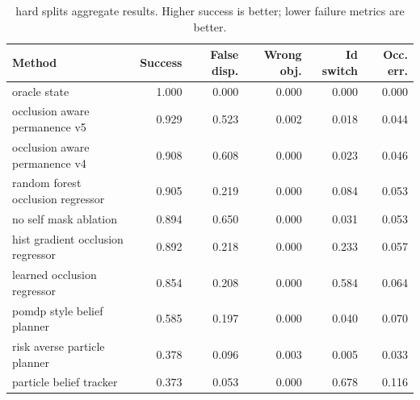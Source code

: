 \begin{table}[t]
\centering
\caption{hard splits aggregate results. Higher success is better; lower failure metrics are better.}
\label{tab:hard_splits}
\small
\begin{tabular}{lrrrrr}
\toprule
Method & Success & False disp. & Wrong obj. & Id switch & Occ. err. \\
\midrule
oracle state & 1.000 & 0.000 & 0.000 & 0.000 & 0.000 \\
occlusion aware permanence v5 & 0.929 & 0.523 & 0.002 & 0.018 & 0.044 \\
occlusion aware permanence v4 & 0.908 & 0.608 & 0.000 & 0.023 & 0.046 \\
random forest occlusion regressor & 0.905 & 0.219 & 0.000 & 0.084 & 0.053 \\
no self mask ablation & 0.894 & 0.650 & 0.000 & 0.031 & 0.053 \\
hist gradient occlusion regressor & 0.892 & 0.218 & 0.000 & 0.233 & 0.057 \\
learned occlusion regressor & 0.854 & 0.208 & 0.000 & 0.584 & 0.064 \\
pomdp style belief planner & 0.585 & 0.197 & 0.000 & 0.040 & 0.070 \\
risk averse particle planner & 0.378 & 0.096 & 0.003 & 0.005 & 0.033 \\
particle belief tracker & 0.373 & 0.053 & 0.000 & 0.678 & 0.116 \\
\bottomrule
\end{tabular}
\end{table}

